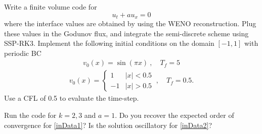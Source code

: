 \documentclass{article}
\begin{document}
\begin{exerciseList}
\item Write a finite volume code for
\[
u_t + au_x = 0
\]
where the interface values are obtained by using the WENO reconstruction. Plug these values in the Godunov flux, and integrate the semi-discrete scheme using SSP-RK3. Implement the following initial conditions on the domain $[-1,1]$ with periodic BC
\begin{gather} \label{inData1}
	v_0(x)=\sin(\pi x)\ ,  
	\quad
	T_f = 5
\end{gather}%
\begin{gather} \label{inData2}
	v_0(x)=\begin{cases}
		1 & |x|<0.5\\
		-1 & |x|>0.5
	\end{cases}\ ,
	\quad
	T_f = 0.5.
\end{gather}%
Use a CFL of 0.5 to evaluate the time-step. 

\item
Run the code for $k=2,3$ and $a=1$. Do you recover the expected order of convergence for \eqref{inData1}? Is the solution oscillatory for \eqref{inData2}?



\end{exerciseList}
\end{document}
